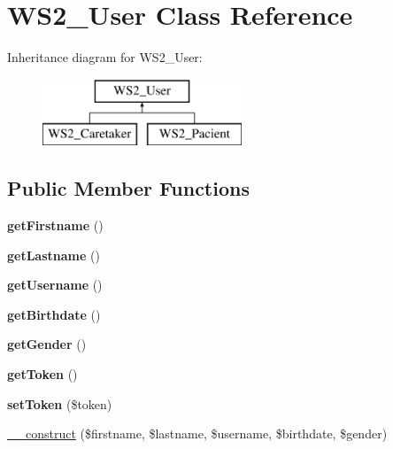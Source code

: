 \hypertarget{class_w_s2___user}{\section{W\+S2\+\_\+\+User Class Reference}
\label{class_w_s2___user}
}
Inheritance diagram for W\+S2\+\_\+\+User\+:\begin{figure}[H]
\begin{center}
\leavevmode
\includegraphics[height=2.000000cm]{class_w_s2___user}
\end{center}
\end{figure}
\subsection*{Public Member Functions}
\begin{DoxyCompactItemize}
\item 
\hypertarget{class_w_s2___user_a42c9621713b6dcdfb9edd5a7630b6d93}{{\bfseries get\+Firstname} ()}\label{class_w_s2___user_a42c9621713b6dcdfb9edd5a7630b6d93}

\item 
\hypertarget{class_w_s2___user_a5d606fdf02d35b79b74b91a88c09000f}{{\bfseries get\+Lastname} ()}\label{class_w_s2___user_a5d606fdf02d35b79b74b91a88c09000f}

\item 
\hypertarget{class_w_s2___user_a81b37a3c9d639574e394f80c1138c75e}{{\bfseries get\+Username} ()}\label{class_w_s2___user_a81b37a3c9d639574e394f80c1138c75e}

\item 
\hypertarget{class_w_s2___user_aeafdb95ad7b97a5ff68ac785e8c243e5}{{\bfseries get\+Birthdate} ()}\label{class_w_s2___user_aeafdb95ad7b97a5ff68ac785e8c243e5}

\item 
\hypertarget{class_w_s2___user_af7313369f22d5c761e16462abe0c6ae1}{{\bfseries get\+Gender} ()}\label{class_w_s2___user_af7313369f22d5c761e16462abe0c6ae1}

\item 
\hypertarget{class_w_s2___user_a211a2979c22afcd7d9056a2bb55aa449}{{\bfseries get\+Token} ()}\label{class_w_s2___user_a211a2979c22afcd7d9056a2bb55aa449}

\item 
\hypertarget{class_w_s2___user_a354f01fe06936133696743e346fc206b}{{\bfseries set\+Token} (\$token)}\label{class_w_s2___user_a354f01fe06936133696743e346fc206b}

\item 
\hyperlink{class_w_s2___user_a718968fc81da151fcdbbdab7bc8e731f}{\+\_\+\+\_\+construct} (\$firstname, \$lastname, \$username, \$birthdate, \$gender)
\end{DoxyCompactItemize}



